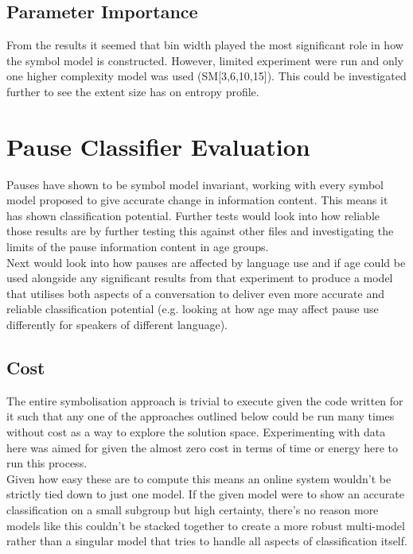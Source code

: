 \subsection{Parameter Importance}
From the results it seemed that bin width played the most significant role in how the symbol model is constructed. However, limited experiment were run and only one higher complexity model was used (SM[3,6,10,15]). This could be investigated further to see the extent size has on entropy profile.

 
\section{Pause Classifier Evaluation}
Pauses have shown to be symbol model invariant, working with every symbol model proposed to give accurate change in information content. This means it has shown classification potential. Further tests would look into how reliable those results are by further testing this against other files and investigating the limits of the pause information content in age groups. \\

Next would look into how pauses are affected by language use and if age could be used alongside any significant results from that experiment to produce a model that utilises both aspects of a conversation to deliver even more accurate and reliable classification potential (e.g. looking at how age may affect pause use differently for speakers of different language). \\

\subsection{Cost}
The entire symbolisation approach is trivial to execute given the code written for it such that any one of the approaches outlined below could be run many times without cost as a way to explore the solution space. Experimenting with data here was aimed for given the almost zero cost in terms of time or energy here to run this process. \\

Given how easy these are to compute this means an online system wouldn't be strictly tied down to just one model. If the given model were to show an accurate classification on a small subgroup but high certainty, there's no reason more models like this couldn't be stacked together to create a more robust multi-model rather than a singular model that tries to handle all aspects of classification itself. \\

